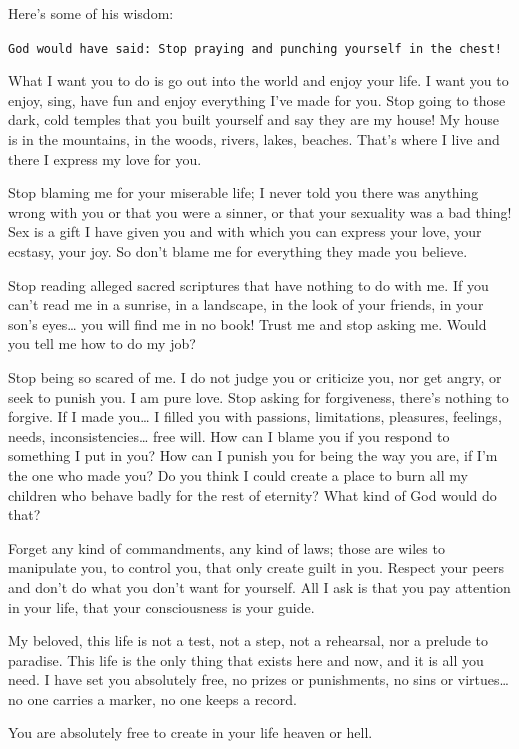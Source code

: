 Here's some of his wisdom:

\texttt{God would have said: Stop praying and punching yourself in the chest!}

What I want you to do is go out into the world and enjoy your life. I want you to enjoy, sing, have fun and enjoy everything I've made for you. Stop going to those dark, cold temples that you built yourself and say they are my house! My house is in the mountains, in the woods, rivers, lakes, beaches. That's where I live and there I express my love for you.

Stop blaming me for your miserable life; I never told you there was anything wrong with you or that you were a sinner, or that your sexuality was a bad thing! Sex is a gift I have given you and with which you can express your love, your ecstasy, your joy. So don't blame me for everything they made you believe.

Stop reading alleged sacred scriptures that have nothing to do with me. If you can't read me in a sunrise, in a landscape, in the look of your friends, in your son's eyes… you will find me in no book! Trust me and stop asking me. Would you tell me how to do my job?

Stop being so scared of me. I do not judge you or criticize you, nor get angry, or seek to punish you. I am pure love. Stop asking for forgiveness, there's nothing to forgive. If I made you… I filled you with passions, limitations, pleasures, feelings, needs, inconsistencies… free will. How can I blame you if you respond to something I put in you? How can I punish you for being the way you are, if I'm the one who made you? Do you think I could create a place to burn all my children who behave badly for the rest of eternity? What kind of God would do that?

Forget any kind of commandments, any kind of laws; those are wiles to manipulate you, to control you, that only create guilt in you. Respect your peers and don't do what you don't want for yourself. All I ask is that you pay attention in your life, that your consciousness is your guide.

My beloved, this life is not a test, not a step, not a rehearsal, nor a prelude to paradise. This life is the only thing that exists here and now, and it is all you need. I have set you absolutely free, no prizes or punishments, no sins or virtues… no one carries a marker, no one keeps a record.

You are absolutely free to create in your life heaven or hell.

